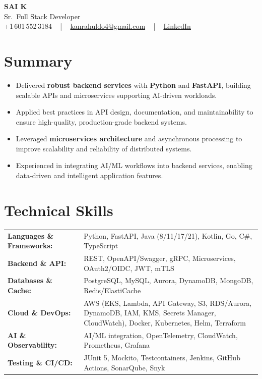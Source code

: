 \documentclass[letterpaper,11pt]{article}
\newcommand{\resumeItem}[1]{
  \item\footnotesize{
    {#1 \vspace{-2pt}}
  }
}
\newcommand{\resumeItemListStart}{\begin{itemize}[leftmargin=*]}
\newcommand{\resumeItemListEnd}{\end{itemize}\vspace{-5pt}}
\begin{document}
\begin{center}
    {\fontsize{14pt}{12pt}\selectfont \textbf{\MakeUppercase{Sai K}}}\\ \vspace{2pt}
    \fontsize{10pt}{12pt}\selectfont Sr.\ Full Stack Developer\\ \vspace{2pt}
    \fontsize{10pt}{12pt}\selectfont +1\,601\,552\,3184 ~ | ~
    \href{mailto:kanrahuldo4@gmail.com}{kanrahuldo4@gmail.com} ~ | ~
    \href{https://www.linkedin.com/in/srrrk/}{\color{blue}\underline{LinkedIn}}
    \vspace{-10pt}
\end{center}

\section{Summary}
\fontsize{9pt}{10pt}\selectfont
\resumeItemListStart
  \resumeItem{Delivered \textbf{robust backend services} with \textbf{Python} and \textbf{FastAPI}, building scalable APIs and microservices supporting AI-driven workloads.}
  \resumeItem{Applied best practices in API design, documentation, and maintainability to ensure high-quality, production-grade backend systems.}
  \resumeItem{Leveraged \textbf{microservices architecture} and asynchronous processing to improve scalability and reliability of distributed systems.}
  \resumeItem{Experienced in integrating AI/ML workflows into backend services, enabling data-driven and intelligent application features.}
\resumeItemListEnd
\vspace{-6pt}

\section{Technical Skills}
\vspace{-14pt}
\begin{table}[h]
\fontsize{9pt}{10pt}\selectfont
\begin{tabular}{p{0.3\linewidth} p{0.7\linewidth}}
\textbf{Languages \& Frameworks:} & Python, FastAPI, Java (8/11/17/21), Kotlin, Go, C\#, TypeScript \\
\textbf{Backend \& API:} & REST, OpenAPI/Swagger, gRPC, Microservices, OAuth2/OIDC, JWT, mTLS \\
\textbf{Databases \& Cache:} & PostgreSQL, MySQL, Aurora, DynamoDB, MongoDB, Redis/ElastiCache \\
\textbf{Cloud \& DevOps:} & AWS (EKS, Lambda, API Gateway, S3, RDS/Aurora, DynamoDB, IAM, KMS, Secrets Manager, CloudWatch), Docker, Kubernetes, Helm, Terraform \\
\textbf{AI \& Observability:} & AI/ML integration, OpenTelemetry, CloudWatch, Prometheus, Grafana \\
\textbf{Testing \& CI/CD:} & JUnit 5, Mockito, Testcontainers, Jenkins, GitHub Actions, SonarQube, Snyk \\
\end{tabular}
\end{table}
\vspace{-15pt}
\end{document}
